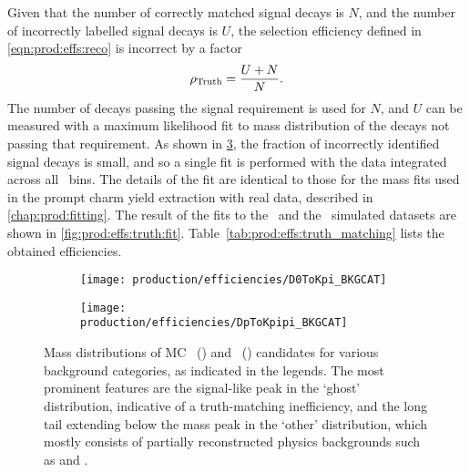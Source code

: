 Given that the number of correctly matched signal decays is $N$, and the number 
of incorrectly labelled signal decays is $U$, the selection efficiency defined 
in \cref{eqn:prod:effs:reco} is incorrect by a factor
\begin{equation}
  \rho_{\textnormal{Truth}} = \frac{U+N}{N}.
  \label{eqn:prod:effs:truth}
\end{equation}
The number of decays passing the signal requirement is used for $N$, and $U$ 
can be measured with a maximum likelihood fit to mass distribution of the 
decays not passing that requirement.
As shown in \cref{fig:prod:effs:truth:categories}, the fraction of incorrectly 
identified signal decays is small, and so a single fit is performed with the 
data integrated across all \pTy\ bins.
The details of the fit are identical to those for the mass fits used in the 
prompt charm yield extraction with real data, described in 
\cref{chap:prod:fitting}.
The result of the fits to the \DzToKpi\ and the \DpToKpipi\ simulated datasets 
are shown in \cref{fig:prod:effs:truth:fit}.
Table~\ref{tab:prod:effs:truth_matching} lists the obtained efficiencies.

\begin{figure}
  \begin{subfigure}[b]{0.5\textwidth}
    \centering
    \texttt{[image: production/efficiencies/D0ToKpi\_BKGCAT]}
    \caption{\PDzero}
    \label{fig:prod:effs:truth:categories:D0ToKpi}
  \end{subfigure}
  \begin{subfigure}[b]{0.5\textwidth}
    \centering
    \texttt{[image: production/efficiencies/DpToKpipi\_BKGCAT]}
    \caption{\PDplus}
    \label{fig:prod:effs:truth:categories:DpToKpipi}
  \end{subfigure}
  \caption{%
    Mass distributions of \ac{MC} 
    \PDzero~() and 
    \PDplus~() candidates for 
    various background categories, as indicated in the legends.
    The most prominent features are the signal-like peak in the `ghost' 
    distribution, indicative of a truth-matching inefficiency, and the long 
    tail extending below the mass peak in the `other' distribution, which 
    mostly consists of partially reconstructed physics backgrounds such as 
    \decay{\PDzero}{\PKminus\Ppiplus\Ppizero} and 
    \decay{\PDplus}{\PKminus\Ppiplus\Ppiplus\Ppizero}.
  }
  \label{fig:prod:effs:truth:categories}
\end{figure}

